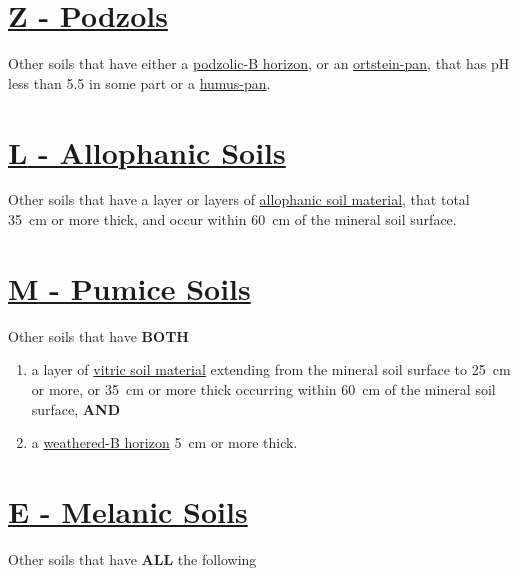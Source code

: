 \documentclass[
  letterpaper,
  DIV=11,
  numbers=noendperiod]{scrreprt}
\providecommand{\tightlist}{%
  \setlength{\itemsep}{0pt}\setlength{\parskip}{0pt}}\usepackage{longtable,booktabs,array}
\begin{document}
\hypertarget{sec-Z}{%
\section{\texorpdfstring{\protect\hyperlink{sec-ord-Z}{\textbf{Z} -
Podzols}}{Z - Podzols}}\label{sec-Z}}

Other soils that have either a
\protect\hyperlink{sec-diag-podzb}{podzolic-B horizon}, or an
\protect\hyperlink{sec-diag-opan}{ortstein-pan}, that has pH less than
5.5 in some part or a \protect\hyperlink{sec-diag-hpan}{humus-pan}.

\hypertarget{sec-L}{%
\section{\texorpdfstring{\protect\hyperlink{sec-ord-L}{\textbf{L} -
Allophanic Soils}}{L - Allophanic Soils}}\label{sec-L}}

Other soils that have a layer or layers of
\protect\hyperlink{sec-diag-alloph}{allophanic soil material}, that
total 35~cm or more thick, and occur within 60~cm of the mineral soil
surface.

\hypertarget{sec-M}{%
\section{\texorpdfstring{\protect\hyperlink{sec-ord-M}{\textbf{M} -
Pumice Soils}}{M - Pumice Soils}}\label{sec-M}}

Other soils that have \textbf{BOTH}

\begin{enumerate}
\def\labelenumi{\arabic{enumi}.}
\tightlist
\item
  a layer of \protect\hyperlink{sec-diag-vitr}{vitric soil material}
  extending from the mineral soil surface to 25~cm or more, or 35~cm or
  more thick occurring within 60~cm of the mineral soil surface,
  \textbf{AND}
\item
  a \protect\hyperlink{sec-diag-bw}{weathered-B horizon} 5~cm or more
  thick.
\end{enumerate}

\hypertarget{sec-E}{%
\section{\texorpdfstring{\protect\hyperlink{sec-ord-E}{\textbf{E} -
Melanic Soils}}{E - Melanic Soils}}\label{sec-E}}

Other soils that have \textbf{ALL} the following
\end{document}
